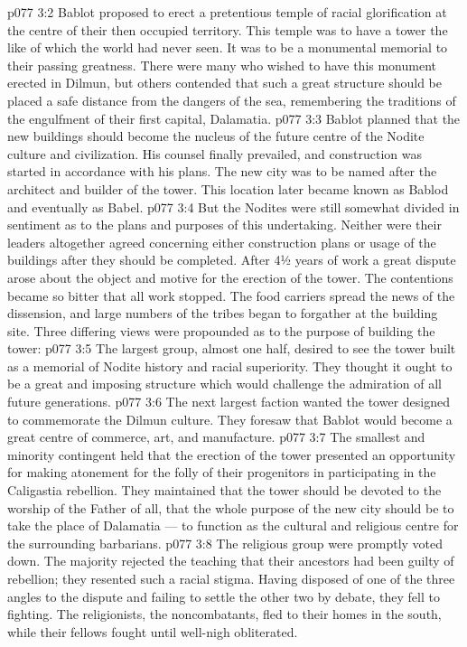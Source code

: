 \vs p077 3:2 Bablot proposed to erect a pretentious temple of racial glorification at the centre of their then occupied territory. This temple was to have a tower the like of which the world had never seen. It was to be a monumental memorial to their passing greatness. There were many who wished to have this monument erected in Dilmun, but others contended that such a great structure should be placed a safe distance from the dangers of the sea, remembering the traditions of the engulfment of their first capital, Dalamatia.
\vs p077 3:3 Bablot planned that the new buildings should become the nucleus of the future centre of the Nodite culture and civilization. His counsel finally prevailed, and construction was started in accordance with his plans. The new city was to be named  after the architect and builder of the tower. This location later became known as Bablod and eventually as Babel.
\vs p077 3:4 But the Nodites were still somewhat divided in sentiment as to the plans and purposes of this undertaking. Neither were their leaders altogether agreed concerning either construction plans or usage of the buildings after they should be completed. After 4½ years of work a great dispute arose about the object and motive for the erection of the tower. The contentions became so bitter that all work stopped. The food carriers spread the news of the dissension, and large numbers of the tribes began to forgather at the building site. Three differing views were propounded as to the purpose of building the tower:
\vs p077 3:5 \bibnobreakspace The largest group, almost one half, desired to see the tower built as a memorial of Nodite history and racial superiority. They thought it ought to be a great and imposing structure which would challenge the admiration of all future generations.
\vs p077 3:6 \bibnobreakspace The next largest faction wanted the tower designed to commemorate the Dilmun culture. They foresaw that Bablot would become a great centre of commerce, art, and manufacture.
\vs p077 3:7 \bibnobreakspace The smallest and minority contingent held that the erection of the tower presented an opportunity for making atonement for the folly of their progenitors in participating in the Caligastia rebellion. They maintained that the tower should be devoted to the worship of the Father of all, that the whole purpose of the new city should be to take the place of Dalamatia --- to function as the cultural and religious centre for the surrounding barbarians.
\vs p077 3:8 \pc The religious group were promptly voted down. The majority rejected the teaching that their ancestors had been guilty of rebellion; they resented such a racial stigma. Having disposed of one of the three angles to the dispute and failing to settle the other two by debate, they fell to fighting. The religionists, the noncombatants, fled to their homes in the south, while their fellows fought until well\hyp{}nigh obliterated.
